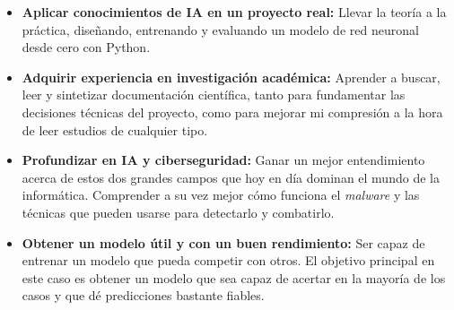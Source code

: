 \begin{itemize}
	\item \textbf{Aplicar conocimientos de IA en un proyecto real:} Llevar la teoría a la práctica, diseñando, entrenando y evaluando un modelo de red neuronal desde cero con Python.
	
	\item \textbf{Adquirir experiencia en investigación académica:} Aprender a buscar, leer y sintetizar documentación científica, tanto para fundamentar las decisiones técnicas del proyecto, como para mejorar mi compresión a la hora de leer estudios de cualquier tipo.
	
	\item \textbf{Profundizar en IA y ciberseguridad:} Ganar un mejor entendimiento acerca de estos dos grandes campos que hoy en día dominan el mundo de la informática. Comprender a su vez mejor cómo funciona el \textit{malware} y las técnicas que pueden usarse para detectarlo y combatirlo.
	
	\item \textbf{Obtener un modelo útil y con un buen rendimiento:} Ser capaz de entrenar un modelo que pueda competir con otros. El objetivo principal en este caso es obtener un modelo que sea capaz de acertar en la mayoría de los casos y que dé predicciones bastante fiables.
\end{itemize}

